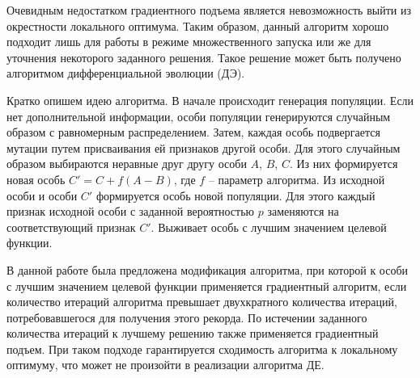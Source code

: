 
Очевидным недостатком градиентного подъема является невозможность выйти из окрестности локального оптимума. Таким образом, данный алгоритм хорошо подходит лишь для работы в режиме множественного запуска или же для уточнения некоторого заданного решения. Такое решение может быть получено алгоритмом дифференциальной эволюции (ДЭ).

Кратко опишем идею алгоритма. В начале происходит генерация популяции. Если нет дополнительной информации, особи популяции генерируются случайным образом с равномерным распределением. Затем, каждая особь подвергается мутации путем присваивания ей признаков другой особи.
Для этого случайным образом выбираются неравные друг другу особи $A$, $B$, $C$. Из них формируется новая особь $C' = C + f(A - B)$, где $f$ -- параметр алгоритма. Из исходной особи и особи $C'$ формируется особь новой популяции. Для этого каждый признак исходной особи с заданной вероятностью $p$ заменяются на соответствующий признак $C'$. Выживает особь с лучшим значением целевой функции.

В данной работе была предложена модификация алгоритма, при которой к особи с лучшим значением целевой функции применяется градиентный алгоритм, если количество итераций алгоритма превышает двухкратного количества итераций, потребовавшегося для получения этого рекорда. По истечении заданного количества итераций к лучшему решению также применяется градиентный подъем. При таком подходе гарантируется сходимость алгоритма к локальному оптимуму, что может не произойти в реализации алгоритма ДЕ.

